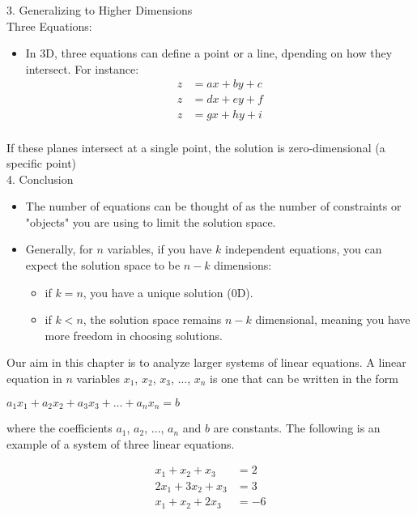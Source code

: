 \documentclass{article}
\begin{document}
3. Generalizing to Higher Dimensions\\
Three Equations:\\
\begin{itemize}
\item In 3D, three equations can define a point or a line, dpending on how they intersect. For instance:
\begin{align*}
z &= ax + by + c\\
z &= dx + ey + f\\
z &= gx + hy + i\\
\end{align*}
\end{itemize}
If these planes intersect at a single point, the solution is zero-dimensional (a specific point)\\

4. Conclusion
\begin{itemize}
\item The number of equations can be thought of as the number of constraints or "objects" you are using to limit the solution space.
\item Generally, for $n$ variables, if you have $k$ independent equations, you can expect the solution space to be $n-k$ dimensions:
	\begin{itemize}
	\item if $k = n$, you have a unique solution (0D).
	\item if $k < n$, the solution space remains $n - k$ dimensional, meaning you have more freedom in choosing solutions.
	\end{itemize}
\end{itemize}

Our aim in this chapter is to analyze larger systems of linear equations. A linear equation in $n$ variables $x_1$, $x_2$, $x_3$, $\dots$, $x_n$ is one that can be written in the form
\begin{center}
$a_1x_1 + a_2x_2 + a_3x_3 + \dots + a_nx_n = b$
\end{center}
where the coefficients $a_1$, $a_2$, $\dots$, $a_n$ and $b$ are constants. The following is an example of a system of three linear equations.
\begin{center}
\begin{align*}
x_1 + x_2 + x_3 &= 2\\
2x_1 + 3x_2 + x_3 &= 3\\
x_1 + x_2 + 2x_3 &= -6
\end{align*}
\end{center}
\end{document}
